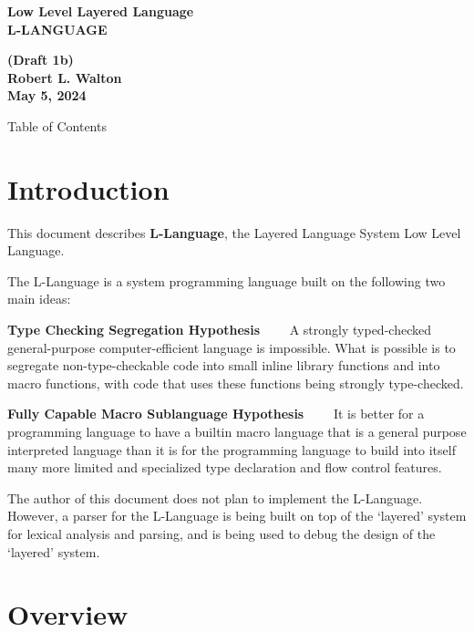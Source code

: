 \documentclass[12pt]{article}
\makeatletter
\renewcommand\tableofcontents{%
    \begin{list}{}%
	     {\setlength{\itemsep}{0in}%
	      \setlength{\topsep}{0in}%
	      \setlength{\parsep}{1ex}%
	      \setlength{\labelwidth}{0in}%
	      \setlength{\baselineskip}{1.5ex}%
	      \setlength{\leftmargin}{0.4in}%
	      \setlength{\rightmargin}{0.4in}}%
    \item\@starttoc{toc}%
    \end{list}}
\newcommand{\key}[1]{{\rm \bfseries #1}}
\newenvironment{indpar}[1][0.3in]%
	{\begin{list}{}%
		     {\setlength{\itemsep}{0in}%
		      \setlength{\topsep}{0in}%
		      \setlength{\parsep}{1ex}%
		      \setlength{\labelwidth}{#1}%
		      \setlength{\leftmargin}{#1}%
		      \addtolength{\leftmargin}{\labelsep}}%
	 \item}%
	{\end{list}}
\makeatother
\begin{document}
\begin{center}
\Large \bf
Low Level Layered Language\\[0.5ex]
\huge \bf
L-LANGUAGE
\end{center}
\begin{center}
\large \bf
(Draft 1b)
\\[0.5ex]
Robert L. Walton\\
May 5, 2024

\bigskip

Table of Contents
\end{center}

\bigskip

\tableofcontents

\newpage

\section{Introduction}

This document describes \key{L-Language}, the Layered Language
System Low Level Language.

The L-Language is a system programming language built on the
following two main ideas:

\begin{indpar}

\key{Type Checking Segregation Hypothesis}~~~~ A strongly typed-checked
general-purpose computer-efficient language is impossible.
What is possible is
to segregate non-type-checkable code into small inline
library functions and into macro functions,
with code that uses these functions being
strongly type-checked.

\key{Fully Capable Macro Sublanguage Hypothesis}~~~~ It is better for
a programming language to have a builtin macro language that
is a general purpose interpreted language than it is for the
programming language to build into itself
many more limited and specialized type declaration and
flow control features.

\end{indpar}

The author of this document does not plan to implement the L-Language.
However, a parser for the L-Language is being built on top of the
`layered' system for lexical analysis and parsing, and is being used
to debug the design of the `layered' system.

\section{Overview}
\end{document}
